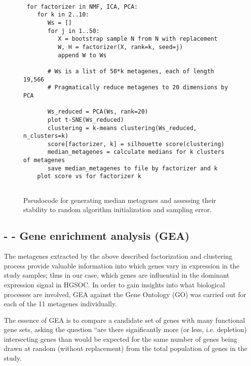 \documentclass[tikz, 11pt,a4paper,oneside,fleqn, draft]{article}
\begin{document}
\begin{figure}[htb!]
\begin{center}
\begin{Verbatim}[baselinestretch=1, frame=single, rulecolor=\color{blue}, label=Metagene Stability Assessment, fontfamily=courier, fontsize=\small]

 for factorizer in NMF, ICA, PCA:
    for k in 2..10:
       Ws = []
       for j in 1..50:
          X = bootstrap sample N from N with replacement
          W, H = factorizer(X, rank=k, seed=j)
          append W to Ws
   	     
       # Ws is a list of 50*k metagenes, each of length 19,566
       # Pragmatically reduce metagenes to 20 dimensions by PCA
   	  
       Ws_reduced = PCA(Ws, rank=20)
       plot t-SNE(Ws_reduced)
       clustering = k-means clustering(Ws_reduced, n_clusters=k)
       score[factorizer, k] = silhouette score(clustering)	  
       median_metagenes = calculate medians for k clusters of metagenes
       save median_metagenes to file by factorizer and k
    plot score vs for factorizer k
      
\end{Verbatim}
\end{center}
\caption{Pseudocode for generating median metagenes and assessing their stability to random algorithm initialization and sampling error.}
\label{fig-clustering-psuedocode}
\end{figure}

	   	  
\subsection{- - Gene enrichment analysis (GEA)}
\label{sec-gea}
The metagenes extracted by the above described factorization and clustering process provide valuable information into which genes vary in expression in the study samples; thus in our case, which genes are influential in the dominant expression signal in HGSOC.  
In order to gain insights into what biological processes are involved, GEA against the Gene Ontology (GO) was carried out for each of the 11 metagenes individually.

The essence of GEA is to compare a candidate set of genes with many functional gene sets, asking the question ``are there significantly more (or less, i.e. depletion) intersecting genes than would be expected for the same number of genes being drawn at random (without replacement) from the total population of genes in the study. 
\end{document}

